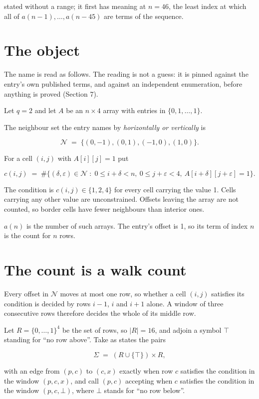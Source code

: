 \documentclass[11pt]{article}
\theoremstyle{definition}
\begin{document}
stated without a range; it first has meaning at $n = 46$, the least index at which all of $a(n-1),\dots,a(n-45)$ are terms of the sequence.

\section{The object}

The name is read as follows. The reading is not a guess: it is pinned against the entry's own published terms, and against an independent enumeration, before anything is proved (Section 7).

Let $q = 2$ and let $A$ be an $n \times 4$ array with entries in $\{0,1,\dots,1\}$.

The neighbour set the entry names by {\itshape horizontally or vertically} is

\[\mathcal{N} \;=\; \{(0,-1), (0,1), (-1,0), (1,0)\}.\]

For a cell $(i,j)$ with $A[i][j] = 1$ put

\[c(i,j) \;=\; \#\bigl\{(\delta,\varepsilon)\in\mathcal{N} \;:\; 0\le i+\delta<n,\ 0\le j+\varepsilon<4,\ A[i+\delta][j+\varepsilon] = 1\bigr\}.\]

The condition is $c(i,j) \in \{1, 2, 4\}$ for every cell carrying the value 1. Cells carrying any other value are unconstrained. Offsets leaving the array are not counted, so border cells have fewer neighbours than interior ones.

$a(n)$ is the number of such arrays. The entry's offset is 1, so its term of index $n$ is the count for $n$ rows.

\section{The count is a walk count}

Every offset in $\mathcal{N}$ moves at most one row, so whether a cell $(i,j)$ satisfies its condition is decided by rows $i-1$, $i$ and $i+1$ alone. A window of three consecutive rows therefore decides the whole of its middle row.

Let $R = \{0,\dots,1\}^{4}$ be the set of rows, so $|R| = 16$, and adjoin a symbol $\top$ standing for ``no row above''. Take as states the pairs

\[\Sigma \;=\; (R \cup \{\top\}) \times R,\]

with an edge from $(p,c)$ to $(c,x)$ exactly when row $c$ satisfies the condition in the window $(p,c,x)$, and call $(p,c)$ accepting when $c$ satisfies the condition in the window $(p,c,\bot)$, where $\bot$ stands for ``no row below''.
\end{document}
